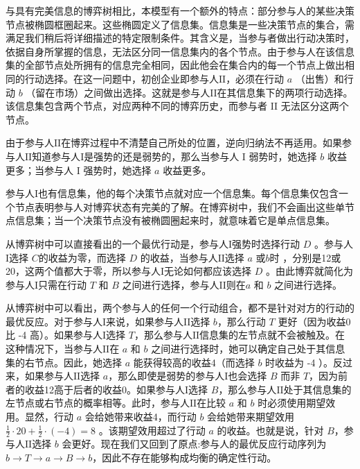 与具有完美信息的博弈树相比，本模型有一个额外的特点：部分参与人的某些决策节点被椭圆框圈起来。这些椭圆定义了信息集。信息集是一些决策节点的集合，需满足我们稍后将详细描述的特定限制条件。其含义是，当参与者做出行动决策时，依据自身所掌握的信息，无法区分同一信息集内的各个节点。由于参与人在该信息集的全部节点处所拥有的信息完全相同，因此他会在集合内的每一个节点上做出相同的行动选择。在这一问题中，初创企业即参与人$\mathrm{II}$，必须在行动 \(a\) （出售）和行动 \(b\) （留在市场）之间做出选择。这就是参与人$\mathrm{II}$在其信息集下的两项行动选择。该信息集包含两个节点，对应两种不同的博弈历史，而参与者 II 无法区分这两个节点。

由于参与人$\mathrm{II}$在博弈过程中不清楚自己所处的位置，逆向归纳法不再适用。如果参与人$\mathrm{II}$知道参与人$\mathrm{I}$是强势的还是弱势的，那么当参与人 \(\mathrm{I}\) 弱势时，她选择 \(b\) 收益更多；当参与人 \(\mathrm{I}\) 强势时，她选择 \(a\) 收益更多。

参与人$\mathrm{I}$也有信息集，他的每个决策节点就对应一个信息集。每个信息集仅包含一个节点表明参与人对博弈状态有完美的了解。在博弈树中，我们不会画出这些单节点信息集；当一个决策节点没有被椭圆圈起来时，就意味着它是单点信息集。

从博弈树中可以直接看出的一个最优行动是，参与人$\mathrm{I}$强势时选择行动 \(D\) 。参与人$\mathrm{I}$选择 \(C\)的收益为零，而选择 \(D\) 的收益，当参与人$\mathrm{II}$选择 \(a\) 或\(b\)时 ，分别是12或20，这两个值都大于零，所以参与人$\mathrm{I}$无论如何都应该选择 \(D\) 。由此博弈就简化为参与人$\mathrm{I}$只需在行动 \(T\) 和 \(B\) 之间进行选择，参与人$\mathrm{II}$则在\(a\) 和 \(b\) 之间进行选择。


从博弈树中可以看出，两个参与人的任何一个行动组合，都不是针对对方的行动的最优反应。对于参与人$\mathrm{I}$来说，如果参与人$\mathrm{II}$选择 \(b\)，那么行动 \(T\) 更好（因为收益0比 -4 高）。如果参与人$\mathrm{I}$选择 \(T\)，那么参与人$\mathrm{II}$信息集的左节点就不会被触及。在这种情况下，当参与人$\mathrm{II}$在 \(a\) 和 \(b\) 之间进行选择时，她可以确定自己处于其信息集的右节点。因此，她选择 \(a\) 能获得较高的收益4（而选择 \(b\) 时收益为 -4 ）。反过来，如果参与人$\mathrm{II}$选择 \(a\)，那么即使是弱势的参与人$\mathrm{I}$也会选择 \(B\) 而非 \(T\)，因为前者的收益12高于后者的收益0。如果参与人$\mathrm{I}$选择 \(B\)，那么参与人$\mathrm{II}$处于其信息集的左节点或右节点的概率相等。此时，参与人$\mathrm{II}$在比较 \(a\) 和 \(b\) 时必须使用期望效用。显然，行动 \(a\) 会给她带来收益4，而行动 \(b\) 会给她带来期望效用 \(\frac{1}{2} \cdot  {20} + \frac{1}{2} \cdot  \left( {-4}\right)  = 8\) 。该期望效用超过了行动 \(a\) 的收益。也就是说，针对 \(B\)，参与人$\mathrm{II}$选择 \(b\) 会更好。现在我们又回到了原点:参与人的最优反应行动序列为 \(b \rightarrow  T \rightarrow  a \rightarrow  B \rightarrow  b\)，因此不存在能够构成均衡的确定性行动。

